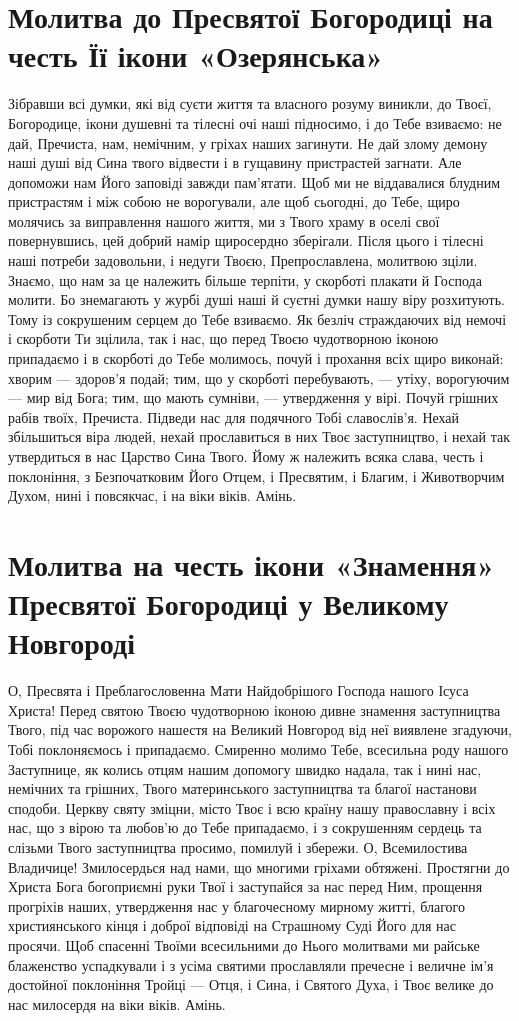 \documentclass[chapters.tex]{subfiles}
\begin{document}
\section{Молитва до Пресвятої Богородиці на честь Її ікони «Озерянська»}
Зібравши всі думки, які від суєти життя та власного розуму виникли, до Твоєї, Богородице, ікони душевні та тілесні очі наші підносимо, і до Тебе взиваємо: не дай, Пречиста, нам, немічним, у гріхах наших загинути. Не дай злому демону наші душі від Сина твого відвести і в гущавину пристрастей загнати. Але допоможи нам Його заповіді завжди пам’ятати. Щоб ми не віддавалися блудним пристрастям і між собою не ворогували, але щоб сьогодні, до Тебе, щиро молячись за виправлення нашого життя, ми з Твого храму в оселі свої повернувшись, цей добрий намір щиросердно зберігали. Після цього і тілесні наші потреби задовольни, і недуги Твоєю, Препрославлена, молитвою зціли. Знаємо, що нам за це належить більше терпіти, у скорботі плакати й Господа молити. Бо знемагають у журбі душі наші й суєтні думки нашу віру розхитують. Тому із сокрушеним серцем до Тебе взиваємо. Як безліч страждаючих від немочі і скорботи Ти зцілила, так і нас, що перед Твоєю чудотворною іконою припадаємо і в скорботі до Тебе молимось, почуй і прохання всіх щиро виконай: хворим — здоров’я подай; тим, що у скорботі перебувають, — утіху, ворогуючим — мир від Бога; тим, що мають сумніви, — утвердження у вірі. Почуй грішних рабів твоїх, Пречиста. Підведи нас для подячного Тобі славослів’я. Нехай збільшиться віра людей, нехай прославиться в них Твоє заступництво, і нехай так утвердиться в нас Царство Сина Твого. Йому ж належить всяка слава, честь і поклоніння, з Безпочатковим Його Отцем, і Пресвятим, і Благим, і Животворчим Духом, нині і повсякчас, і на віки віків. Амінь.

\section{Молитва на честь ікони «Знамення» Пресвятої Богородиці у Великому Новгороді}
О, Пресвята і Преблагословенна Мати Найдобрішого Господа нашого Ісуса Христа! Перед святою Твоєю чудотворною іконою дивне знамення заступництва Твого, під час ворожого нашестя на Великий Новгород від неї виявлене згадуючи, Тобі поклоняємось і припадаємо. Смиренно молимо Тебе, всесильна роду нашого Заступнице, як колись отцям нашим допомогу швидко надала, так і нині нас, немічних та грішних, Твого материнського заступництва та благої настанови сподоби. Церкву святу зміцни, місто Твоє і всю країну нашу православну і всіх нас, що з вірою та любов’ю до Тебе припадаємо, і з сокрушенням сердець та слізьми Твого заступництва просимо, помилуй і збережи. О, Всемилостива Владичице! Змилосердься над нами, що многими гріхами обтяжені. Простягни до Христа Бога богоприємні руки Твої і заступайся за нас перед Ним, прощення прогріхів наших, утвердження нас у благочесному мирному житті, благого християнського кінця і доброї відповіді на Страшному Суді Його для нас просячи. Щоб спасенні Твоїми всесильними до Нього молитвами ми райське блаженство успадкували і з усіма святими прославляли пречесне і величне ім’я достойної поклоніння Тройці — Отця, і Сина, і Святого Духа, і Твоє велике до нас милосердя на віки віків. Амінь.
\end{document}
